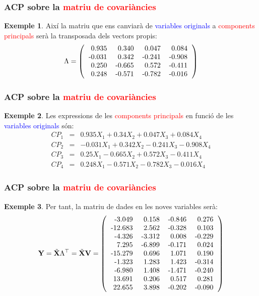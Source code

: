 \documentclass[12pt,t]{beamer}
\newcommand{\red}[1]{\textcolor{red}{#1}}
\newcommand{\blue}[1]{\textcolor{blue}{#1}}
\theoremstyle{plain}
\theoremstyle{definition}
\newtheorem{exemple}{Exemple}
\begin{document}
\begin{frame}
\frametitle{ACP sobre la \red{matriu de covariàncies}}
\begin{exemple}
{
Així la matriu que ens canviarà de \blue{variables originals} a \red{components principals} serà la transposada dels vectors propis:
\[
\Lambda=
\left(
\begin{tabular}{rrrr}
  0.935 & 0.340 & 0.047 & 0.084 \\ 
  -0.031 & 0.342 & -0.241 & -0.908 \\ 
  0.250 & -0.665 & 0.572 & -0.411 \\ 
  0.248 & -0.571 & -0.782 & -0.016 \\ 
  \end{tabular}\right)
\]
}
\end{exemple}
\end{frame}


\begin{frame}
\frametitle{ACP sobre la \red{matriu de covariàncies}}
\begin{exemple}
Les expressions de les \red{components principals} en funció de les \blue{variables originals} són:
\begin{eqnarray*}
CP_1 &=& 0.935X_1 
+0.34X_2
+0.047X_3 
+0.084X_4
\\
CP_2 &=& -0.031X_1
+0.342X_2
-0.241X_3 
-0.908X_4
\\
CP_3 &=& 0.25X_1
-0.665X_2
+0.572X_3 
-0.411X_4 \\
CP_4 &=& 0.248X_1
-0.571X_2
-0.782X_3 
-0.016X_4
\end{eqnarray*}
\end{exemple}
\end{frame}

\begin{frame}
\frametitle{ACP sobre la \red{matriu de covariàncies}}
\begin{exemple}
{\small
Per tant, la matriu de dades en les noves variables serà:
\[
\mathbf{Y}=\tilde{\mathbf{X}}\Lambda^\top = \tilde{\mathbf{X}}\mathbf{V}=
\left(
\begin{tabular}{rrrr}
  -3.049 & 0.158 & -0.846 & 0.276 \\ 
  -12.683 & 2.562 & -0.328 & 0.103 \\ 
  -4.326 & -3.312 & 0.008 & -0.229 \\ 
  7.295 & -6.899 & -0.171 & 0.024 \\ 
  -15.279 & 0.696 & 1.071 & 0.190 \\ 
  -1.323 & 1.283 & 1.423 & -0.314 \\ 
  -6.980 & 1.408 & -1.471 & -0.240 \\ 
  13.691 & 0.206 & 0.517 & 0.281 \\ 
  22.655 & 3.898 & -0.202 & -0.090 \\ 
  \end{tabular}\right)
\]
}
\end{exemple}
\end{frame}
\end{document}
